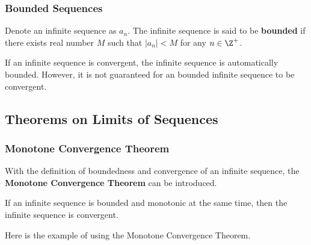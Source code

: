 \subsubsection{Bounded Sequences}
\begin{dft}
  Denote an infinite sequence as $a_{n}$. The infinite sequence is said to be \textbf{bounded} if there exists real number $M$ such that $\left| a_{n}\right| <M$ for any $n\in \Z^{+}$.
\end{dft}\n

If an infinite sequence is convergent, the infinite sequence is automatically bounded. However, it is not guaranteed for an bounded infinite sequence to be convergent.

\subsection{Theorems on Limits of Sequences}
\subsubsection{Monotone Convergence Theorem}
With the definition of boundedness and convergence of an infinite sequence, the \textbf{Monotone Convergence Theorem} can be introduced.\n

\begin{thm}
  If an infinite sequence is bounded and monotonic at the same time, then the infinite sequence is convergent.
\end{thm}\n

Here is the example of using the Monotone Convergence Theorem.\n

